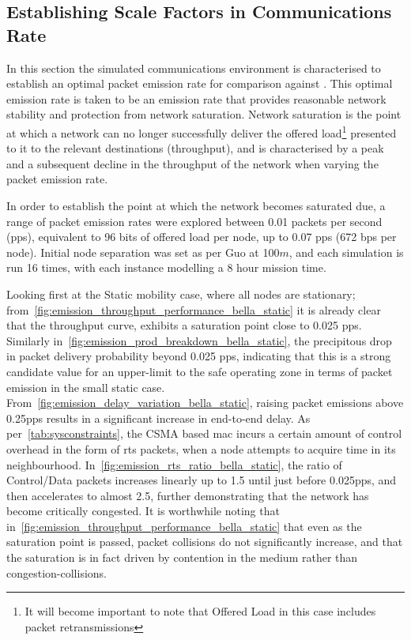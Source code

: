 \subsection{Establishing Scale Factors in Communications Rate}

In this section the simulated communications environment is characterised to establish an optimal packet emission rate for comparison against \cite{Guo11}.
This optimal emission rate is taken to be an emission rate that provides reasonable network stability and protection from network saturation.
Network saturation is the point at which a network can no longer successfully deliver the offered load\footnote{It will become important to note that Offered Load in this case includes packet retransmissions} presented to it to the relevant destinations (throughput), and is characterised by a peak and a subsequent decline in the throughput of the network when varying the packet emission rate. 

In order to establish the point at which the network becomes saturated due, a range of packet emission rates were explored between 0.01 packets per second (pps), equivalent to 96 bits of offered load per node, up to 0.07 pps (672 bps per node).
Initial node separation was set as per Guo at 100$m$, and each simulation is run 16 times, with each instance modelling a 8 hour mission time.

Looking first at the Static mobility case, where all nodes are stationary; from~\autoref{fig:emission_throughput_performance_bella_static} it is already clear that the throughput curve, exhibits a saturation point close to 0.025 pps.
Similarly in~\autoref{fig:emission_prod_breakdown_bella_static}, the precipitous drop in packet delivery probability beyond 0.025 pps, indicating that this is a strong candidate value for an upper-limit to the safe operating zone in terms of packet emission in the small static case.
From~\autoref{fig:emission_delay_variation_bella_static}, raising packet emissions above 0.25pps results in a significant increase in end-to-end delay.
As per~\autoref{tab:sysconstraints}, the CSMA based \gls{mac} incurs a certain amount of control overhead in the form of \gls{rts} packets, when a node attempts to acquire time in its neighbourhood.
In~\autoref{fig:emission_rts_ratio_bella_static}, the ratio of Control/Data packets increases linearly up to 1.5 until just before 0.025pps, and then accelerates to almost 2.5, further demonstrating that the network has become critically congested.
It is worthwhile noting that in~\autoref{fig:emission_throughput_performance_bella_static} that even as the saturation point is passed, packet collisions do not significantly increase, and that the saturation is in fact driven by contention in the medium rather than congestion-collisions.

